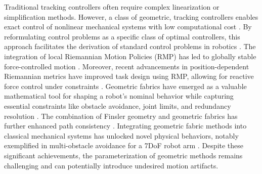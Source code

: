 Traditional tracking controllers often require complex linearization or simplification methods. However, a class of geometric, tracking controllers enables exact control of nonlinear mechanical systems with low computational cost \cite{udwadia2003new}. By reformulating control problems as a specific class of optimal controllers, this approach facilitates the derivation of standard control problems in robotics \cite{peters2008unifying}.
The integration of local Riemannian Motion Policies (RMP) has led to globally stable force-controlled motion \cite{cheng2020rmp}. Moreover, recent advancements in position-dependent Riemannian metrics have improved task design using RMP, allowing for reactive force control under constraints \cite{bylard2021composable}.
Geometric fabrics have emerged as a valuable mathematical tool for shaping a robot's nominal behavior while capturing essential constraints like obstacle avoidance, joint limits, and redundancy resolution \cite{xie2020geometric}. The combination of Finsler geometry and geometric fabrics has further enhanced path consistency \cite{ratliff2021generalized}.
Integrating geometric fabric methods into classical mechanical systems has unlocked novel physical behaviors, notably exemplified in multi-obstacle avoidance for a 7DoF robot arm \cite{van2022geometric}. Despite these significant achievements, the parameterization of geometric methods remains challenging and can potentially introduce undesired motion artifacts.


